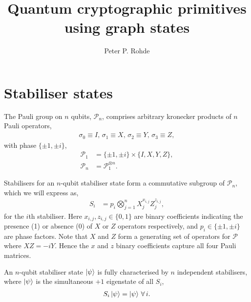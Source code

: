 \documentclass[twocolumn, aps, amsmath, amssymb, nofootinbib, superscriptaddress, longbibliography, doublefloatfix, table-of-contents, eqsecnum, rmp]{revtex4-2}
\begin{document}
\title{Quantum cryptographic primitives using graph states}

\author{Peter P. Rohde}

\maketitle

\tableofcontents

%

\section{Stabiliser states}


The Pauli group on $n$ qubits, $\mathcal{P}_n$, comprises arbitrary kronecker products of $n$ Pauli operators,
\begin{align}
	\sigma_0 \equiv I,\, \sigma_1 \equiv X,\, \sigma_2 \equiv Y,\, \sigma_3 \equiv Z,
\end{align}
with phase $\{\pm 1,\pm i\}$,
\begin{align}
	\mathcal{P}_1 &= \{\pm 1,\pm i\} \times \{I,X,Y,Z\}, \nonumber\\
	\mathcal{P}_n &= \mathcal{P}_1^{\otimes n}.
\end{align}

Stabilisers for an $n$-qubit stabiliser state form a commutative subgroup of $\mathcal{P}_n$, which we will express as,
\begin{align}
	S_i &= p_i \bigotimes_{j=1}^n X_j^{x_{i,j}}Z_j^{z_{i,j}},
\end{align}
for the $i$th stabiliser. Here $x_{i,j}, z_{i,j}\in\{0,1\}$ are binary coefficients indicating the presence (1) or absence (0) of $X$ or $Z$ operators respectively, and $p_i\in\{\pm 1,\pm i\}$ are phase factors. Note that $X$ and $Z$ form a generating set of operators for $\mathcal{P}$ where $XZ=-iY$. Hence the $x$ and $z$ binary coefficients capture all four Pauli matrices.

An $n$-qubit stabiliser state $\ket\psi$ is fully characterised by $n$ independent stabilisers, where $\ket\psi$ is the simultaneous $+1$ eigenstate of all $S_i$,
\begin{align}
	S_i \ket\psi = \ket\psi \,\forall\,i.
\end{align}
\end{document}
